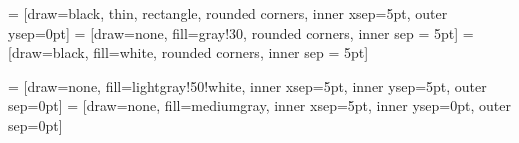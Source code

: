 \renewcommand{\tocEntry}[1]{
	\texorpdfstring{#1}{#1}%
}

\makeatother


\newcommand{\q}{{\ensuremath{\mathbf{q}}}}

\newcommand{\SF}{SF}
\newcommand{\OI}{OI}
\newcommand{\SD}{\SF{}PULSES}
\newcommand{\DO}{\SF{}DIRS}
\newcommand{\FD}{\SF{}}

\newcommand{\SFshort}{\SF$_{90}$}
\newcommand{\SFlong}{\SF$_{360}$}
\newcommand{\OIlong}{\OI$_{360}$}

\newcommand{\FDmod}{\FD{\ensuremath{_{mod}}}}
\newcommand{\SFasym}{A\SF{}}

 = [draw=black, thin, rectangle, rounded corners, inner xsep=5pt, outer ysep=0pt]  = [draw=none, fill=gray!30, rounded corners, inner sep = 5pt]  = [draw=black, fill=white, rounded corners, inner sep = 5pt]



\setlength{\abovecaptionskip}{4pt} %
\setlength{\belowcaptionskip}{4pt} %
 = [draw=none, fill=lightgray!50!white, inner xsep=5pt, inner ysep=5pt, outer sep=0pt]
 = [draw=none, fill=mediumgray, inner xsep=5pt, inner ysep=0pt, outer sep=0pt]


\usepackage{stringstrings}
\DeclareRobustCommand*\MakeTitlecase[1]{%
  \caselower[e]{#1}%
  \capitalizetitle{\thestring}%
}

\makeatletter

